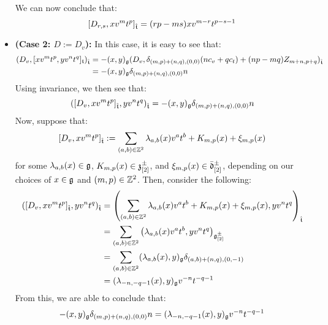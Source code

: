 \begin{remark}
\begin{itemize}
                    We can now conclude that:
                        $$[D_{r, s}, x v^m t^p]_{\hat{\mathfrak{t}}} = ( rp - ms ) x v^{m - r} t^{p - s - 1}$$
                    \item \textbf{(Case 2: $D := D_v$):} In this case, it is easy to see that:
                        $$
                            \begin{aligned}
                                ( D_v, [x v^m t^p, y v^n t^q]_{\mathfrak{t}} )_{\hat{\mathfrak{t}}} & = -(x, y)_{\mathfrak{g}} ( D_v, \delta_{(m, p) + (n, q), (0, 0)} ( n c_v + q c_t ) + (np - mq) Z_{m + n, p + q} )_{\hat{\mathfrak{t}}}
                                \\
                                & = -(x, y)_{\mathfrak{g}} \delta_{(m, p) + (n, q), (0, 0)} n
                            \end{aligned}
                        $$
                    Using invariance, we then see that:
                        $$( [D_v, x v^m t^p]_{\hat{\mathfrak{t}}}, y v^n t^q )_{\hat{\mathfrak{t}}} = -(x, y)_{\mathfrak{g}} \delta_{(m, p) + (n, q), (0, 0)} n$$
                    Now, suppose that:
                        $$[D_v, x v^m t^p]_{\hat{\mathfrak{t}}} := \sum_{(a, b) \in \mathbb{Z}^2} \lambda_{a, b}(x) v^a t^b + K_{m, p}(x) + \xi_{m, p}(x)$$
                    for some $\lambda_{a, b}(x) \in \mathfrak{g}$, $K_{m, p}(x) \in \mathfrak{z}_{[2]}^{\pm}$, and $\xi_{m, p}(x) \in \bar{\mathfrak{d}}_{[2]}^{\pm}$, depending on our choices of $x \in \mathfrak{g}$ and $(m, p) \in \mathbb{Z}^2$. Then, consider the following:
                        $$
                            \begin{aligned}
                                ( [D_v, x v^m t^p]_{\hat{\mathfrak{t}}}, y v^n t^q )_{\hat{\mathfrak{t}}} & = \left( \sum_{(a, b) \in \mathbb{Z}^2} \lambda_{a, b}(x) v^a t^b + K_{m, p}(x) + \xi_{m, p}(x), y v^n t^q \right)_{\hat{\mathfrak{t}}}
                                \\
                                & = \sum_{(a, b) \in \mathbb{Z}^2} \left( \lambda_{a, b}(x) v^a t^b, y v^n t^q \right)_{\mathfrak{g}_{[2]}^{\pm}}
                                \\
                                & = \sum_{(a, b) \in \mathbb{Z}^2} (\lambda_{a, b}(x), y)_{\mathfrak{g}} \delta_{ (a, b) + (n, q), (0, -1) }
                                \\
                                & = (\lambda_{-n, -q - 1}(x), y)_{\mathfrak{g}} v^{-n} t^{-q - 1}
                            \end{aligned}
                        $$
                    From this, we are able to conclude that:
                        $$-(x, y)_{\mathfrak{g}} \delta_{(m, p) + (n, q), (0, 0)} n = (\lambda_{-n, -q - 1}(x), y)_{\mathfrak{g}} v^{-n} t^{-q - 1}$$

\end{itemize}
\end{remark}
